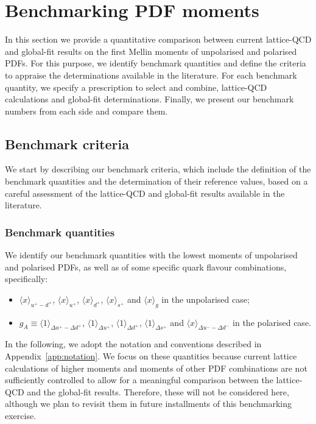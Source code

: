 \section{Benchmarking PDF moments}
\label{sec:benchmarking}

In this section we provide a quantitative comparison between 
current lattice-QCD and global-fit results on the first
Mellin moments of unpolarised and polarised PDFs.
%
For this purpose, we identify benchmark quantities
and define the criteria to appraise the determinations
available in the literature.
%
For each benchmark quantity, we specify a prescription to 
select and combine, lattice-QCD calculations and global-fit determinations.
%
Finally, we present our benchmark numbers from each side and compare them.

\subsection{Benchmark criteria}
\label{subsec:BC}

We start by describing our benchmark criteria, which include the definition
of the benchmark quantities and the determination of their reference values,
based on a careful assessment of the lattice-QCD and global-fit results 
available in the literature.

\subsubsection{Benchmark quantities}
\label{subsubsec:BQ}

We identify our benchmark quantities with the lowest moments of unpolarised 
and polarised PDFs, as well as of some specific quark
flavour combinations, specifically:
\begin{itemize}
  \item
$\langle x\rangle_{u^+-d^+}$, $\langle x \rangle_{u^+}$, $\langle x \rangle_{d^+}$, 
$\langle x \rangle_{s^+}$ and $\langle x \rangle_{g}$ in the unpolarised case; 
\item $g_A\equiv\langle 1 \rangle_{\Delta u^+ - \Delta d ^+}$, 
$\langle 1 \rangle_{\Delta u^+}$, $\langle 1 \rangle_{\Delta d^+}$,  
$\langle 1 \rangle_{\Delta s^+}$ and $\langle x \rangle_{\Delta u^- - \Delta d^-}$ 
  in the polarised case.
  \end{itemize}
%
In the following, we adopt the notation and conventions
described in Appendix~\ref{app:notation}.
%
We focus on these quantities because current lattice 
calculations of higher moments and moments of other PDF 
combinations are not sufficiently controlled to allow for a meaningful 
comparison between the lattice-QCD and the global-fit results.
%
Therefore, these will not be considered here, although we plan to revisit
them in future installments of this benchmarking exercise.

